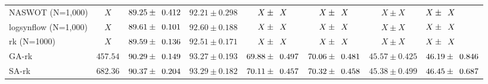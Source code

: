 \documentclass[sigconf]{acmart}
\begin{document}
\begin{table*}[htb]
\begin{tabular}{@{}lccccccl@{}}
        NASWOT (N=1,000) & $X$ & $89.25\pm \z{0.412}$ & $92.21\pm 0.298$ & $X\pm \z{X}$ & $X\pm \z{X}$ & $X\pm X$ & $X\pm \z{X}$ \\ 
        logsynflow (N=1,000) & $X$ & $89.61\pm \z{0.101}$ & $92.60\pm 0.188$ & $X\pm \z{X}$ & $X\pm \z{X}$ & $X\pm X$ & $X\pm \z{X}$ \\ 
        rk (N=1000) & $X$ & $89.59\pm \z{0.136}$ & $92.51\pm 0.171$ & $X\pm \z{X}$ & $X\pm \z{X}$ & $X\pm X$ & $X\pm \z{X}$ \\ 
        GA-rk & $457.54$ & $90.29\pm \z{0.149}$ & $93.27\pm0.193$ & $69.88\pm \z{0.497}$ & $70.06\pm \z{0.481}$ & $45.57\pm 0.425$ & $46.19\pm \z{0.846}$ \\ 
        SA-rk & $682.36$ & $90.37\pm \z{0.204}$ & $93.29\pm0.182$ & $70.11\pm \z{0.457}$ & $70.32\pm \z{0.458}$ & $45.38\pm 0.499$ & $46.45\pm \z{0.687}$ \\ \bottomrule
        \end{tabular}
        \label{table:overall_sss}
          \vspace{-\baselineskip}
      \end{table*}
\end{document}
